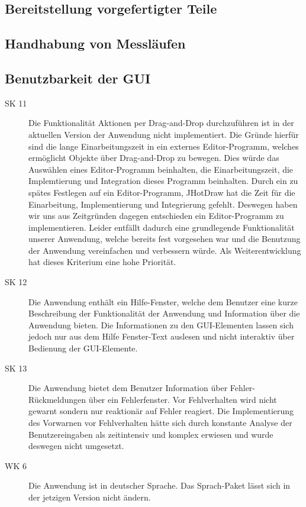 \documentclass[parskip=full]{scrartcl}
\begin{document}
\subsection {Bereitstellung vorgefertigter Teile}

\subsection{Handhabung von Messläufen}

\subsection {Benutzbarkeit der GUI}

\begin{description}
\item[SK 11] Die Funktionalität Aktionen per Drag-and-Drop durchzuführen ist in der aktuellen Version der Anwendung nicht implementiert. Die Gründe hierfür sind die lange Einarbeitungszeit in ein externes Editor-Programm, welches ermöglicht Objekte über Drag-and-Drop zu bewegen. Dies würde das Auswählen eines Editor-Programm beinhalten, die Einarbeitungszeit, die Implemtierung und Integration dieses Programm beinhalten. Durch ein zu spätes Festlegen auf ein Editor-Programm, \gls{JHotDraw} hat die Zeit für die Einarbeitung, Implementierung und Integrierung gefehlt. Deswegen haben wir uns aus Zeitgründen dagegen entschieden ein Editor-Programm zu implementieren. Leider entfällt dadurch eine grundlegende Funktionalität unserer Anwendung, welche bereits fest vorgesehen war und die Benutzung der Anwendung vereinfachen und verbessern würde. Als Weiterentwicklung hat dieses Kriterium eine hohe Priorität.
\item[SK 12] Die Anwendung enthält ein Hilfe-Fenster, welche dem Benutzer eine kurze Beschreibung der Funktionalität der Anwendung und Information über die Anwendung bieten. Die Informationen zu den GUI-Elementen lassen sich jedoch nur aus dem Hilfe Fenster-Text auslesen und nicht interaktiv über Bedienung der GUI-Elemente.
\item[SK 13] Die Anwendung bietet dem Benutzer Information über Fehler-Rückmeldungen über ein Fehlerfenster. 
Vor Fehlverhalten wird nicht gewarnt sondern nur reaktionär auf Fehler reagiert. Die Implementierung des Vorwarnen vor Fehlverhalten hätte sich durch konstante Analyse der Benutzereingaben als zeitintensiv und komplex erwiesen und wurde deswegen nicht umgesetzt.
\item[WK 6] Die Anwendung ist in deutscher Sprache. Das Sprach-Paket lässt sich in der jetzigen Version nicht ändern.

\end{description}
\end{document}
